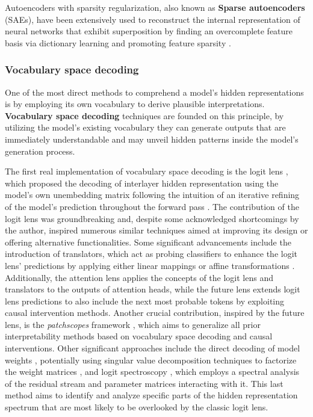 
Autoencoders with sparsity regularization, also known as \textbf{Sparse autoencoders} (SAEs), have been extensively used to reconstruct the internal representation of neural networks that exhibit superposition by finding an overcomplete feature basis via dictionary learning and promoting feature sparsity \cite{bricken2023, cunningham2023}.

\subsubsection{Vocabulary space decoding}

One of the most direct methods to comprehend a model's hidden representations is by employing its own vocabulary to derive plausible interpretations. \textbf{Vocabulary space decoding} techniques are founded on this principle, by utilizing the model's existing vocabulary they can generate outputs that are immediately understandable and may unveil hidden patterns inside the model's generation process.

The first real implementation of vocabulary space decoding is the logit lens \cite{nostalgebraist2020}, which proposed the decoding of interlayer hidden representation using the model's own unembedding matrix following the intuition of an iterative refining of the model's prediction throughout the forward pass \cite{jastrzebski2017}.
The contribution of the logit lens was groundbreaking and, despite some acknowledged shortcomings by the author, inspired numerous similar techniques aimed at improving its design or offering alternative functionalities.
Some significant advancements include the introduction of translators, which act as probing classifiers to enhance the logit lens' predictions by applying either linear mappings \cite{din2024} or affine transformations \cite{belrose2023a}.
Additionally, the attention lens \cite{sakarvadia2023} applies the concepts of the logit lens and translators to the outputs of attention heads, while the future lens \cite{pal2023} extends logit lens predictions to also include the next most probable tokens by exploiting causal intervention methods.
Another crucial contribution, inspired by the future lens, is the \emph{patchscopes} framework \cite{ghandeharioun2024}, which aims to generalize all prior interpretability methods based on vocabulary space decoding and causal interventions.
Other significant approaches include the direct decoding of model weights \cite{dar2023}, potentially using singular value decomposition techniques to factorize the weight matrices \cite{millidge2022}, and logit spectroscopy \cite{cancedda2024}, which employs a spectral analysis of the residual stream and parameter matrices interacting with it.
This last method aims to identify and analyze specific parts of the hidden representation spectrum that are most likely to be overlooked by the classic logit lens.

